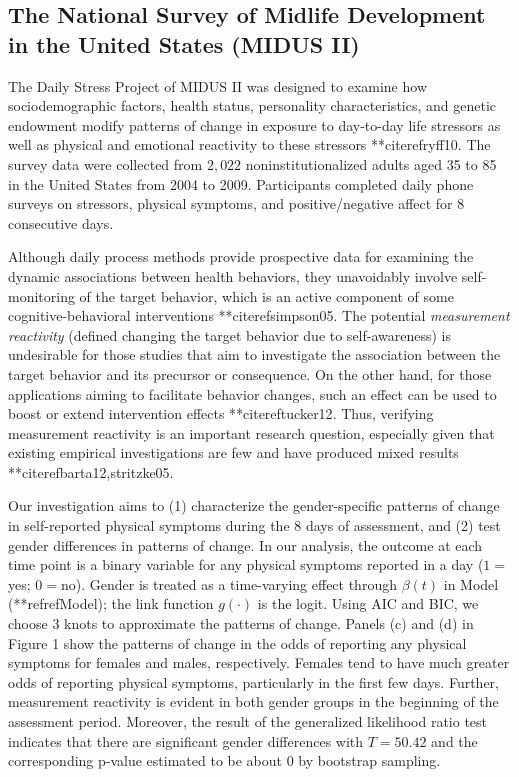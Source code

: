\subsection{The National Survey of Midlife Development in the
United States (MIDUS II)}

The Daily Stress Project of MIDUS II was designed to examine how
sociodemographic factors, health status, personality
characteristics, and genetic endowment modify patterns of change
in exposure to day-to-day life stressors as well as physical and
emotional reactivity to these stressors **citeref{ryff10}. The survey
data were collected from $2,022$ noninstitutionalized adults aged
35 to 85 in the United States from 2004 to 2009. Participants
completed daily phone surveys on stressors, physical symptoms, and
positive/negative affect for 8 consecutive days.

Although daily process methods provide prospective data for
examining the dynamic associations between health behaviors, they
unavoidably involve self-monitoring of the target behavior, which
is an active component of some cognitive-behavioral interventions
**citeref{simpson05}. The potential \emph{measurement reactivity}
(defined changing the target behavior due to self-awareness) is
undesirable for those studies that aim to investigate the
association between the target behavior and its precursor or
consequence. On the other hand, for those applications aiming to
facilitate behavior changes, such an effect can be used to boost
or extend intervention effects **citeref{tucker12}. Thus, verifying
measurement reactivity is an important research question,
especially given that existing empirical investigations are few
and have produced mixed results **citeref{barta12,stritzke05}.

Our investigation aims to (1) characterize the gender-specific
patterns of change in self-reported physical symptoms during the 8
days of assessment, and (2) test gender differences in patterns of
change. In our analysis, the outcome at each time point is a
binary variable for any physical symptoms reported in a day
($1=$yes; $0=$no). Gender is treated as a time-varying effect
through $\beta(t)$ in Model (**refref{Model}); the link function
$g(\cdot)$ is the logit. Using AIC and BIC, we choose 3 knots to
approximate the patterns of change. Panels (c) and (d) in Figure 1
show the patterns of change in the odds of reporting any physical
symptoms for females and males, respectively. Females tend to have
much greater odds of reporting physical symptoms, particularly in
the first few days. Further, measurement reactivity is evident in
both gender groups in the beginning of the assessment period.
Moreover, the result of the generalized likelihood ratio test
indicates that there are significant gender differences with
$T=50.42$ and the corresponding p-value estimated to be about $0$
by bootstrap sampling.


